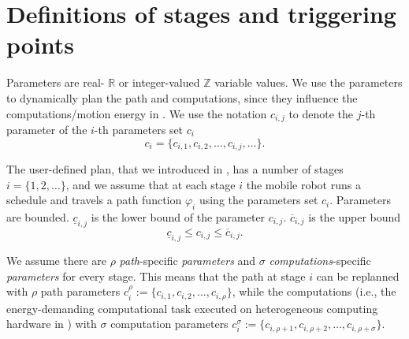 \section{Definitions of stages and triggering points}
\label{sec:defs-stages-triggs}



Parameters are real- $\mathbb{R}$ or integer-valued $\mathbb{Z}$ variable values. We use the parameters to dynamically plan the path and computations, since they influence the computations/motion energy in . We use the notation  $c_{i,j}$ to denote the $j$-th parameter of the $i$-th parameters set $c_i$
\begin{equation}
  c_i=\{c_{i,1},c_{i,2},\dots,c_{i,j},\dots\}.
\end{equation}

The user-defined plan, that we introduced in , has a number of stages $i=\{1,2,\dots\}$, and we assume that at each stage $i$ the mobile robot runs a schedule and travels a path function $\varphi_i$ using the parameters set $c_i$. Parameters are bounded. $\underline{c}_{i,j}$ is the lower bound of the parameter $c_{i,j}$. $\overline{c}_{i,j}$ is the upper bound
\begin{equation}
  \underline{c}_{i,j}\leq c_{i,j}\leq\overline{c}_{i,j}.
\end{equation}

We assume there are $\rho$ \emph{path}-specific \emph{parameters} and $\sigma$ \emph{computations}-specific \emph{parameters} for every stage. This means that the path at stage $i$ can be replanned with $\rho$ path parameters
$c_i^\rho:=\{c_{i,1},c_{i,2},\dots,c_{i,\rho}\}$,
while the computations (i.e., the energy-demanding computational task executed on heterogeneous computing hardware in ) with $\sigma$ computation parameters 
$c_i^\sigma:=\{c_{i,\rho+1},c_{i,\rho+2},\dots,c_{i,\rho+\sigma}\}$.

